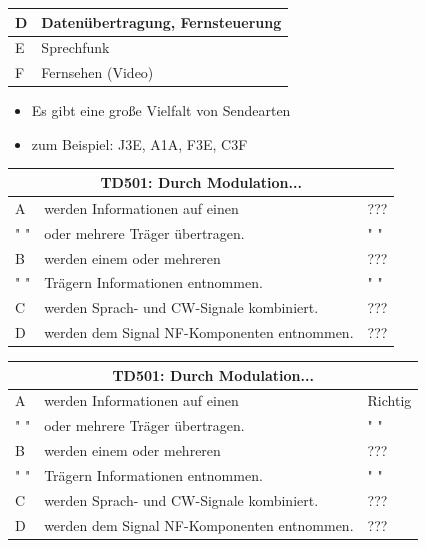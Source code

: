 \begin{frame}
\begin{tiny}
\begin{minipage}{0.4\textwidth}
\begin{tabular}{|l|l|}
		D & Datenübertragung, Fernsteuerung\\ \hline
		E & Sprechfunk \\ \hline
		F & Fernsehen (Video)\\ \hline	
	\end{tabular}
\end{minipage}
\end{tiny}
\vspace{0.5cm}
\begin{itemize}
	\item Es gibt eine große Vielfalt von Sendearten
	\item zum Beispiel: J3E, A1A, F3E, C3F
\end{itemize}
\end{frame}

\begin{frame}
	\begin{small}	
	\begin{tabular}{|l|l|l|}
	\hline
		\multicolumn{3}{|c|}{\textbf{TD501: Durch Modulation...}}\\
		\hline
		A & werden Informationen auf einen & ??? \\
		" " &  oder mehrere Träger übertragen. & " " \\ \hline
		B & werden einem oder mehreren & ??? \\ 
		" " & Trägern Informationen entnommen.  & " " \\ \hline
		C & werden Sprach- und CW-Signale kombiniert.  & ??? \\ \hline
		D & werden dem Signal NF-Komponenten entnommen. & ??? \\ \hline 	
	\end{tabular}
	\end{small}
\end{frame}

\begin{frame}
	\begin{small}	
	\begin{tabular}{|l|l|l|}
	\hline
		\multicolumn{3}{|c|}{\textbf{TD501: Durch Modulation...}}\\
		\hline
		A & werden Informationen auf einen & Richtig \\
		" " &  oder mehrere Träger übertragen. & " " \\ \hline
		B & werden einem oder mehreren & ??? \\ 
		" " & Trägern Informationen entnommen.  & " " \\ \hline
		C & werden Sprach- und CW-Signale kombiniert.  & ??? \\ \hline
		D & werden dem Signal NF-Komponenten entnommen. & ??? \\ \hline 	
	\end{tabular}
	\end{small}
\end{frame}

